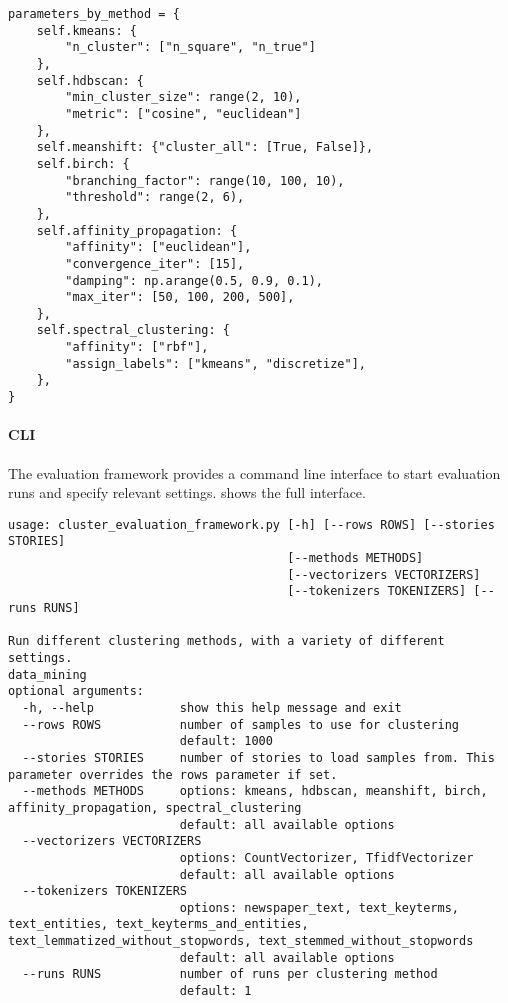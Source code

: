 \begin{lstlisting}[caption=Predefined parameters for different clustering methods,label={lst:cluster_method_parameters}]
parameters_by_method = {
    self.kmeans: {
        "n_cluster": ["n_square", "n_true"]
    },
    self.hdbscan: {
        "min_cluster_size": range(2, 10),
        "metric": ["cosine", "euclidean"]
    },
    self.meanshift: {"cluster_all": [True, False]},
    self.birch: {
        "branching_factor": range(10, 100, 10),
        "threshold": range(2, 6),
    },
    self.affinity_propagation: {
        "affinity": ["euclidean"],
        "convergence_iter": [15],
        "damping": np.arange(0.5, 0.9, 0.1),
        "max_iter": [50, 100, 200, 500],
    },
    self.spectral_clustering: {
        "affinity": ["rbf"],
        "assign_labels": ["kmeans", "discretize"],
    },
}
\end{lstlisting}

\paragraph{CLI}
The evaluation framework provides a command line interface to start evaluation runs and specify relevant settings.
 shows the full interface.

\begin{lstlisting}[caption=Command line interface for the evaluation framework, label={lst:cluster_evaluation_framework}]
usage: cluster_evaluation_framework.py [-h] [--rows ROWS] [--stories STORIES]
                                       [--methods METHODS]
                                       [--vectorizers VECTORIZERS]
                                       [--tokenizers TOKENIZERS] [--runs RUNS]

Run different clustering methods, with a variety of different settings.
data_mining
optional arguments:
  -h, --help            show this help message and exit
  --rows ROWS           number of samples to use for clustering 
                        default: 1000
  --stories STORIES     number of stories to load samples from. This parameter overrides the rows parameter if set.
  --methods METHODS     options: kmeans, hdbscan, meanshift, birch, affinity_propagation, spectral_clustering 
                        default: all available options
  --vectorizers VECTORIZERS
                        options: CountVectorizer, TfidfVectorizer 
                        default: all available options
  --tokenizers TOKENIZERS
                        options: newspaper_text, text_keyterms, text_entities, text_keyterms_and_entities, text_lemmatized_without_stopwords, text_stemmed_without_stopwords 
                        default: all available options
  --runs RUNS           number of runs per clustering method 
                        default: 1
\end{lstlisting}